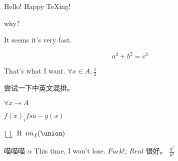 \documentclass[utf8]{ctexart}
\begin{document}
Hello!
Happy \TeX ing!

why?

It seems it's very fast.

\begin{equation}
    a^2+b^2=c^3
\end{equation}

That's what I want.
\(\forall x \in A, \frac{1}{2}\)

尝试一下中英文混排。

\(\forall x \to A\)

\(f(x)_{i}  fsa- g(x)\)

\(\bigsqcup_{i}\)
\(\rm{R}\)
\(im_{f}(\union)\)

喵喵喵
\(\alpha\)
This time, I won't lose. \(Fuck!\);
\( Real\)
很好。
\(\frac{q^{2}}{p^{3}}\)
\end{document}
